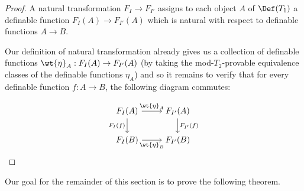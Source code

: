\documentclass[11pt]{article}
\begin{document}
\begin{proof}
  A natural transformation $F_{I} \to F_{I'}$ assigns to each object $A$ of $\Def(T_1)$ a definable function $F_I(A) \to F_{I'}(A)$ which is natural with respect to definable functions $A \to B$.

  Our definition of natural transformation already gives us a collection of definable functions $\wt{\eta}_A : F_I(A) \to F_{I'}(A)$ (by taking the mod-$T_2$-provable equivalence classes of the definable functions $\eta_A$) and so it remains to verify that for every definable function $f : A \to B$, the following diagram commutes:

  $$
  \begin{tikzcd}[ampersand replacement = \&]
F_I(A) \arrow[swap]{d}{F_I(f)} \arrow{r}{\wt{\eta}_A} \& F_{I'}(A) \arrow{d}{F_{I'}(f)}  \\
F_I(B) \arrow[swap]{r}{\wt{\eta}_B} \&  F_{I'}(B)
  \end{tikzcd}
  $$
  \end{proof}



Our goal for the remainder of this section is to prove the following theorem.
  
\end{document}
